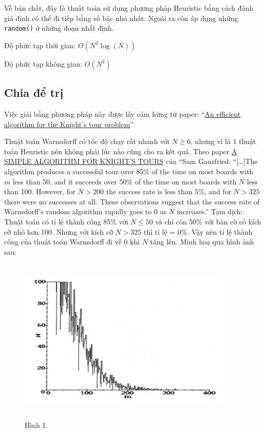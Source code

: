 \documentclass[
]{article}
\begin{document}
Về bản chất, đây là thuật toán sử dụng phương pháp Heuristic bằng cách
đánh giá đỉnh có thể đi tiếp bằng số bậc nhỏ nhất. Ngoài ra còn áp dụng
những \texttt{random()} ở những đoạn nhất định.

Độ phức tạp thời gian: \(O(N^2\log(N))\)

Độ phức tạp không gian: \(O(N^2)\)

\hypertarget{chia-ux111ux1ec3-trux1ecb}{%
\subsection{Chia để trị}\label{chia-ux111ux1ec3-trux1ecb}}

Việc giải bằng phương pháp này được lấy cảm hứng từ paper:
``\href{https://www.mimuw.edu.pl/~rytter/TEACHING/ALCOMB/parberry_algoknight.pdf}{An
efficient algorithm for the Knight's tour problem}''

Thuật toán Warnsdorff có tốc độ chạy rất nhanh với \(N \ge 6\), nhưng vì
là 1 thuật toán Heuristic nên không phải lúc nào cũng cho ra kết quả.
Theo paper
\href{https://sites.science.oregonstate.edu/math_reu/proceedings/REU_Proceedings/Proceedings2004/2004Ganzfried.pdf}{A
SIMPLE ALGORITHM FOR KNIGHT'S TOURS} của ``Sam Ganzfried:
``{[}\ldots{]}The algorithm produces a successful tour over 85\% of the
time on most boards with \(m\) less than 50, and it succeeds over 50\%
of the time on most boards with \(N\) less than 100. However, for
\(N>200\) the success rate is less than 5\%, and for \(N>325\) there
were no successes at all. These observations suggest that the success
rate of Warnsdorff's random algorithm rapidly goes to 0 as \(N\)
increases.'' Tạm dịch: Thuật toán có tỉ lệ thành công 85\% với
\(N \le 50\) và chỉ còn 50\% với bàn cờ có kích cỡ nhỏ hơn 100. Nhưng
với kích cỡ \(N>325\) thì tỉ lệ = 0\%. Vậy nên tỉ lệ thành công của
thuật toán Warnsdorff đi về 0 khi \(N\) tăng lên. Minh hoạ qua hình ảnh
sau:

\begin{figure}
\centering
\includegraphics[width=4.16667in,height=3.125in]{Homework 5 Trial and Error 3b646dc8160042df9d000a4baa7eeb4e/Untitled 2.png}
\caption{Hình 1.}
\end{figure}
\end{document}
